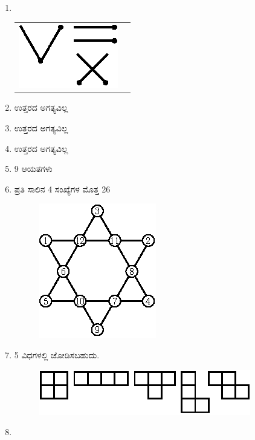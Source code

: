 \begin{enumerate}
\medskip
\item 
~

\begin{tabular}[t]{cc}
\includegraphics{images/chap1/ans12.eps} & \raisebox{.7cm}{$= 100 = \left\{\overline{X} = 10000\right\}$}
\end{tabular}

\item ಉತ್ತರದ ಅಗತ್ಯವಿಲ್ಲ 

\item ಉತ್ತರದ ಅಗತ್ಯವಿಲ್ಲ 

\item ಉತ್ತರದ ಅಗತ್ಯವಿಲ್ಲ 

\item 9 ಆಯತಗಳು 


\item ಪ್ರತಿ ಸಾಲಿನ 4 ಸಂಖ್ಯೆಗಳ ಮೊತ್ತ  26
\begin{figure}[H]
\centering
\includegraphics{images/chap1/ans17.eps}
\end{figure}

\eject

\item 5 ವಿಧಗಳಲ್ಲಿ ಜೋಡಿಸಬಹುದು.
\begin{figure}[H]
\centering
\includegraphics{images/chap1/ans18.eps}
\end{figure}



\item 
~


\end{enumerate}
